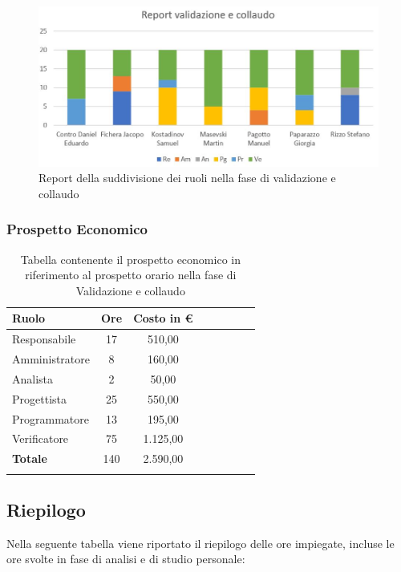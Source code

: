 \documentclass[../piano_di_progetto.tex]{subfiles}
\begin{document}
\begin{figure}[H]
\centering
\includegraphics[width=12cm]{img/report_valid_collaudo}
\caption{Report della suddivisione dei ruoli nella fase di validazione e collaudo}
\end{figure}

\subsubsection{Prospetto Economico}

\begin{center}
	\begin{longtable}{|l|c|c|c|c|c|c|c|}
		\hline
		\rowcolor{lightgray}
		\textbf{Ruolo} & \textbf{Ore} & \textbf{Costo in €}\\

		\hline
		Responsabile & 17 & 510,00\\
		\hline
		Amministratore & 8 & 160,00\\
		\hline
		Analista & 2 & 50,00\\
		\hline
		Progettista & 25 & 550,00\\
		\hline
		Programmatore & 13 & 195,00\\
		\hline
		Verificatore & 75 & 1.125,00\\
		\hline
		\textbf{Totale} & 140 & 2.590,00\\
		\hline
		\caption{Tabella contenente il prospetto economico in riferimento al prospetto orario nella fase di Validazione e collaudo}
	\end{longtable}
\end{center}


\subsection{Riepilogo}%
\label{sub:riepilog}
Nella seguente tabella viene riportato il riepilogo delle ore impiegate, incluse le ore svolte in fase di analisi e di studio personale:
\end{document}
